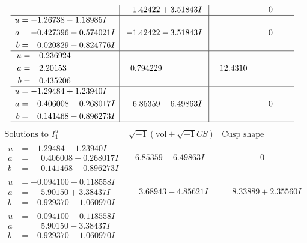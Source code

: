 \documentclass[1p]{elsarticle_modified}
\theoremstyle{definition}
\newcommand{\I}{\sqrt{-1}}
\begin{document}
$$\begin{array}{c|c|c}
 & -1.42422 + 3.51843 I & \phantom{-0.000000 } 0 \\ \hline\begin{aligned}
u &= -1.26738 - 1.18985 I \\
a &= -0.427396 - 0.574021 I \\
b &= \phantom{-}0.020829 - 0.824776 I\end{aligned}
 & -1.42422 - 3.51843 I & \phantom{-0.000000 } 0 \\ \hline\begin{aligned}
u &= -0.236924\phantom{ +0.000000I} \\
a &= \phantom{-}2.20153\phantom{ +0.000000I} \\
b &= \phantom{-}0.435206\phantom{ +0.000000I}\end{aligned}
 & \phantom{-}0.794229\phantom{ +0.000000I} & \phantom{-}12.4310\phantom{ +0.000000I} \\ \hline\begin{aligned}
u &= -1.29484 + 1.23940 I \\
a &= \phantom{-}0.406008 - 0.268017 I \\
b &= \phantom{-}0.141468 - 0.896273 I\end{aligned}
 & -6.85359 - 6.49863 I & \phantom{-0.000000 } 0\\
 \hline 
 \end{array}$$\newpage$$\begin{array}{c|c|c}  
\text{Solutions to }I^u_{1}& \I (\text{vol} + \sqrt{-1}CS) & \text{Cusp shape}\\
 \hline 
\begin{aligned}
u &= -1.29484 - 1.23940 I \\
a &= \phantom{-}0.406008 + 0.268017 I \\
b &= \phantom{-}0.141468 + 0.896273 I\end{aligned}
 & -6.85359 + 6.49863 I & \phantom{-0.000000 } 0 \\ \hline\begin{aligned}
u &= -0.094100 + 0.118558 I \\
a &= \phantom{-}5.90150 + 3.38437 I \\
b &= -0.929370 + 1.060970 I\end{aligned}
 & \phantom{-}3.68943 - 4.85621 I & \phantom{-}8.33889 + 2.35560 I \\ \hline\begin{aligned}
u &= -0.094100 - 0.118558 I \\
a &= \phantom{-}5.90150 - 3.38437 I \\
b &= -0.929370 - 1.060970 I\end{aligned}

\end{array}$$
\end{document}
